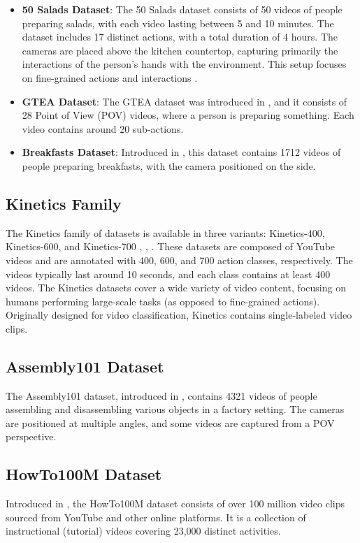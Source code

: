 \begin{itemize}
    \item \textbf{50 Salads Dataset}: The 50 Salads dataset consists of 50 videos of people preparing salads, with each video lasting between 5 and 10 minutes. The dataset includes 17 distinct actions, with a total duration of 4 hours. The cameras are placed above the kitchen countertop, capturing primarily the interactions of the person's hands with the environment. This setup focuses on fine-grained actions and interactions \cite{50salads-dataset}.
    
    \item \textbf{GTEA Dataset}: The GTEA dataset was introduced in \cite{gtea-dataset}, and it consists of 28 Point of View (POV) videos, where a person is preparing something. Each video contains around 20 sub-actions.
    
    \item \textbf{Breakfasts Dataset}: Introduced in \cite{breakfast-dataset}, this dataset contains 1712 videos of people preparing breakfasts, with the camera positioned on the side.
\end{itemize}

\subsection*{Kinetics Family}
The Kinetics family of datasets is available in three variants: Kinetics-400, Kinetics-600, and Kinetics-700 \cite{kinetics-400-dataset}, \cite{kinetics-600-dataset}, \cite{kinetics-700-dataset}. These datasets are composed of YouTube videos and are annotated with 400, 600, and 700 action classes, respectively. The videos typically last around 10 seconds, and each class contains at least 400 videos. The Kinetics datasets cover a wide variety of video content, focusing on humans performing large-scale tasks (as opposed to fine-grained actions). Originally designed for video classification, Kinetics contains single-labeled video clips.

\subsection*{Assembly101 Dataset}
The Assembly101 dataset, introduced in \cite{assembly101-dataset}, contains 4321 videos of people assembling and disassembling various objects in a factory setting. The cameras are positioned at multiple angles, and some videos are captured from a POV perspective.

\subsection*{HowTo100M Dataset}
Introduced in \cite{howto100m-dataset}, the HowTo100M dataset consists of over 100 million video clips sourced from YouTube and other online platforms. It is a collection of instructional (tutorial) videos covering 23,000 distinct activities.

